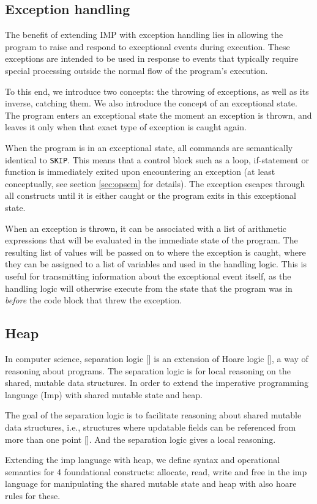 \subsection{Exception handling}

The benefit of extending IMP with exception handling lies in allowing the program to raise and respond to exceptional events during execution. These exceptions are intended to be used in response to events that typically require special processing outside the normal flow of the program's execution.

To this end, we introduce two concepts: the throwing of exceptions, as well as its inverse, catching them. We also introduce the concept of an exceptional state. The program enters an exceptional state the moment an exception is thrown, and leaves it only when that exact type of exception is caught again.

When the program is in an exceptional state, all commands are semantically identical to \verb|SKIP|. This means that a control block such as a loop, if-statement or function is immediately exited upon encountering an exception (at least conceptually, see section \ref{sec:opsem}  for details). The exception escapes through all  constructs until it is either caught or the program exits in this exceptional state.

When an exception is thrown, it can be associated with a list of arithmetic expressions that will be evaluated in the immediate state of the program. The resulting list of values will be passed on to where the exception is caught, where they can be assigned to a list of variables and used in the handling logic. This is useful for transmitting information about the exceptional event itself, as the handling logic will otherwise execute from the state that the program was in \emph{before} the code block that threw the exception.

\subsection{Heap}
In computer science, separation logic [\cite{wiki-sep}] is an extension of Hoare logic [\cite{wiki-hoare}], a way of reasoning about programs. The separation logic is for local reasoning on the shared, mutable data structures. In order to extend the imperative programming language (Imp) with shared mutable state and heap.

The goal of the separation logic is to facilitate reasoning about shared mutable data structures, i.e., structures where updatable fields can be referenced from more than one point [\cite{wiki-sep}].  And the separation logic gives a local reasoning.

Extending the imp language with heap, we define syntax and operational semantics  for 4 foundational constructs: allocate, read, write and free in the imp language for manipulating the shared mutable state and heap with also hoare rules for these.
